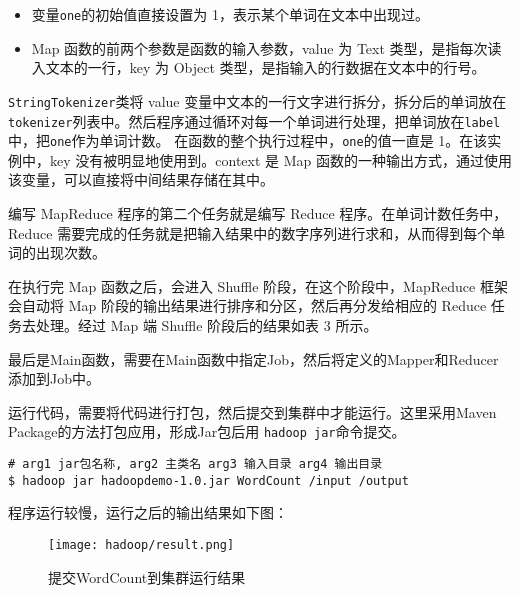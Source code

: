 \begin{itemize}
	\item 变量\lstinline{one}的初始值直接设置为 1，表示某个单词在文本中出现过。
	\item Map 函数的前两个参数是函数的输入参数，value 为 Text 类型，是指每次读入文本的一行，key 为 Object 类型，是指输入的行数据在文本中的行号。
\end{itemize}

\lstinline{StringTokenizer}类将 value 变量中文本的一行文字进行拆分，拆分后的单词放在\lstinline{tokenizer}列表中。然后程序通过循环对每一个单词进行处理，把单词放在\lstinline{label}中，把\lstinline{one}作为单词计数。
在函数的整个执行过程中，\lstinline{one}的值一直是 1。在该实例中，key 没有被明显地使用到。context 是 Map 函数的一种输出方式，通过使用该变量，可以直接将中间结果存储在其中。

编写 MapReduce 程序的第二个任务就是编写 Reduce 程序。在单词计数任务中，Reduce 需要完成的任务就是把输入结果中的数字序列进行求和，从而得到每个单词的出现次数。

在执行完 Map 函数之后，会进入 Shuffle 阶段，在这个阶段中，MapReduce 框架会自动将 Map 阶段的输出结果进行排序和分区，然后再分发给相应的 Reduce 任务去处理。经过 Map 端 Shuffle 阶段后的结果如表 3 所示。



最后是Main函数，需要在Main函数中指定Job，然后将定义的Mapper和Reducer添加到Job中。



运行代码，需要将代码进行打包，然后提交到集群中才能运行。这里采用Maven Package的方法打包应用，形成Jar包后用
\lstinline{hadoop jar}命令提交。

\begin{lstlisting}[style=mysh,title=提交WordCount到集群]
# arg1 jar包名称, arg2 主类名 arg3 输入目录 arg4 输出目录
$ hadoop jar hadoopdemo-1.0.jar WordCount /input /output
\end{lstlisting}

程序运行较慢，运行之后的输出结果如下图：

\begin{figure}[h]
	\centering
	\texttt{[image: hadoop/result.png]}
	\caption{提交WordCount到集群运行结果}
	\label{fig:hadoop-wordcount}
\end{figure}

